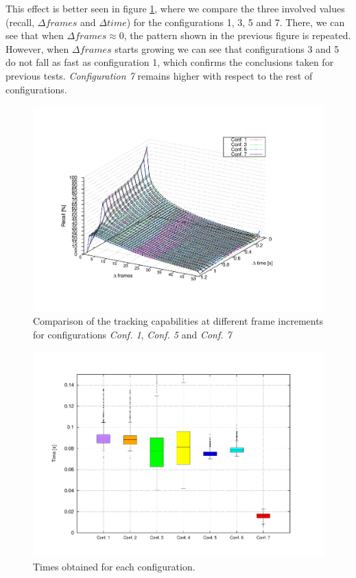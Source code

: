 This effect is better seen in figure \ref{fig:cp04_recall_vs_delta_frames_vs_step}, where we compare the three involved values (recall, $\Delta frames$ and $\Delta time$) for the configurations 1, 3, 5 and 7. There, we can see that when $\Delta frames \approx 0$, the pattern shown in the previous figure is repeated. However, when $\Delta frames$ starts growing we can see that configurations 3 and 5 do not fall as fast as configuration 1, which confirms the conclusions taken for previous tests. \emph{Configuration 7} remains higher with respect to the rest of configurations.

\begin{figure}[t]
\centering
\includegraphics[width=\textwidth,height=0.5\textwidth,trim=80 90 140 90,clip]{recall_vs_delta_frames_vs_step_28b_1_16b}
\caption{Comparison of the tracking capabilities at different frame increments for configurations \emph{Conf. 1}, \emph{Conf. 5} and \emph{Conf. 7}}\label{fig:cp04_recall_vs_delta_frames_vs_step}
\end{figure}

\begin{figure}[h!]
\centering
\includegraphics[width=\textwidth,height=0.5\textwidth,trim=50 40 80 60,clip]{times_average}
\caption{Times obtained for each configuration.}\label{fig:cp04_times_average}
\end{figure}

